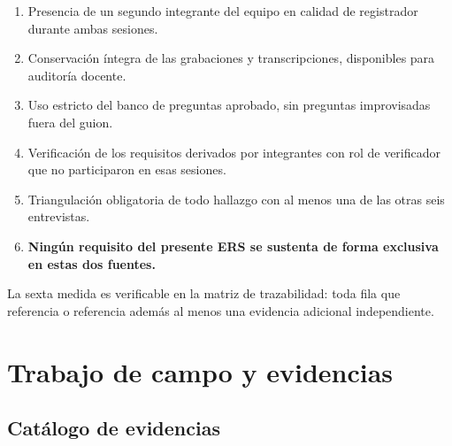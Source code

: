 \begin{enumerate}[nosep]
  \item Presencia de un segundo integrante del equipo en calidad de registrador durante ambas sesiones.
  \item Conservación íntegra de las grabaciones y transcripciones, disponibles para auditoría docente.
  \item Uso estricto del banco de preguntas aprobado, sin preguntas improvisadas fuera del guion.
  \item Verificación de los requisitos derivados por integrantes con rol de verificador que no participaron en esas sesiones.
  \item Triangulación obligatoria de todo hallazgo con al menos una de las otras seis entrevistas.
  \item \textbf{Ningún requisito del presente ERS se sustenta de forma exclusiva en estas dos fuentes.}
\end{enumerate}

\noindent
La sexta medida es verificable en la matriz de trazabilidad: toda fila que referencia  o
 referencia además al menos una evidencia adicional independiente.

\newpage
\section{Trabajo de campo y evidencias}

\subsection{Catálogo de evidencias}

